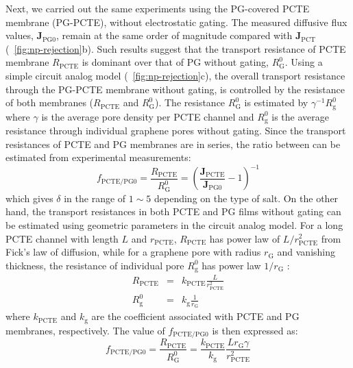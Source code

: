 Next, we carried out the same experiments using the PG-covered PCTE
membrane (PG-PCTE), without electrostatic gating. The measured
diffusive flux values, $\symbf{J}_{\mathrm{PG0}}$, remain at the same
order of magnitude compared with $\symbf{J}_{\mathrm{PCT}}$
(~\autoref{fig:np-rejection}b).
%
Such results suggest that the transport resistance of PCTE membrane
$R_{\mathrm{PCTE}}$ is dominant over that of PG without gating,
$R_{\mathrm{G}}^{0}$.
%
Using a simple circuit analog model (~\autoref{fig:np-rejection}c),
the overall transport resistance through the PG-PCTE membrane without
gating, is controlled by the resistance of both membranes
($R_{\mathrm{PCTE}}$ and $R_{\mathrm{G}}^{0}$). The resistance
$R_{\mathrm{G}}^{0}$ is estimated by $\gamma^{-1} R_{\mathrm{g}}^{0}$
where $\gamma$ is the average pore density per PCTE channel and
$R_{\mathrm{g}}^{0}$ is the average resistance through individual graphene
pores without gating.
%
Since the transport
resistances of PCTE and PG membranes are in series, the ratio between
can be estimated from experimental measurements:
\begin{equation}
  \label{eq:np-resist-ratio}
  f_{\mathrm{PCTE/PG0}} = \frac{R_{\mathrm{PCTE}}}{R_{\mathrm{G}}^{0}}
  = \left(\frac{\symbf{J}_{\mathrm{PCTE}}}{\symbf{J}_{\mathrm{PG0}}} -1 \right)^{-1}
\end{equation}%
%
which gives $\delta$ in the range of $1\sim{}5$
depending on the type of salt.
%
On the other hand, the transport resistances in both PCTE and PG films without gating can be estimated using geometric parameters in the circuit analog model.
%
For a long PCTE channel with length $L$ and $r_{\mathrm{PCTE}}$,
$R_{\mathrm{PCTE}}$ has power law of $L/r_{\mathrm{PCTE}}^{2}$ from
Fick's law of diffusion, while for a graphene pore with radius
$r_{\mathrm{G}}$ and vanishing thickness, the resistance of individual
pore $R_{\mathrm{g}}^{0}$ has power law $1/r_{\mathrm{G}}$
\cite{O_Hern_2014_ion}:
\begin{subequations}
\begin{eqnarray}
  \label{eq:np-R-both}
  R_{\mathrm{PCTE}} &= &k_{\mathrm{PCTE}} \frac{L}{r_{\mathrm{PCTE}}^{2}} \\
  R_{\mathrm{g}}^{0} &= &k_{\mathrm{g}} \frac{1}{r_{\mathrm{G}}}
\end{eqnarray}
\end{subequations}
where $k_{\mathrm{PCTE}}$ and $k_{\mathrm{g}}$ are the coefficient
associated with PCTE and PG membranes, respectively. The value of
$f_{\mathrm{PCTE/PG0}}$ is then expressed as:
\begin{equation}
  \label{eq:np-delta-resistance}
  f_{\mathrm{PCTE/PG0}}
  = \frac{R_{\mathrm{PCTE}}}{R_{\mathrm{G}}^{0}}
  = {\displaystyle
    \frac{k_{\mathrm{PCTE}}}{k_{\mathrm{g}}}
    \frac{L r_{\mathrm{G}} \gamma}
        {r_{\mathrm{PCTE}}^{2}}}
\end{equation}
